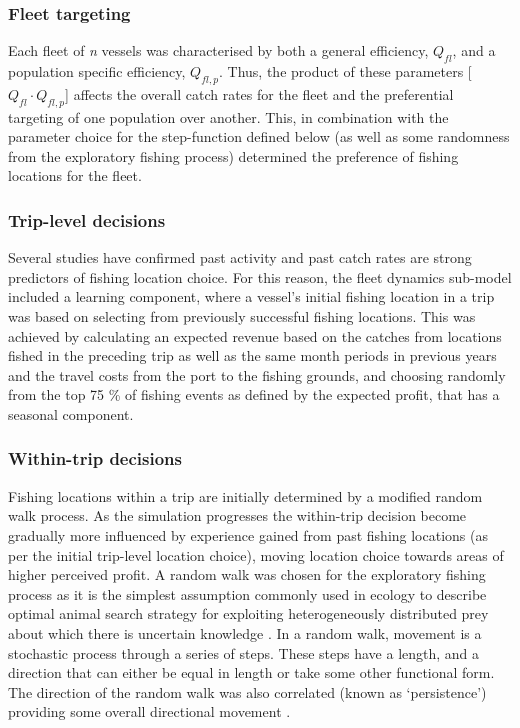 \documentclass[review]{elsarticle}
\begin{document}
\subsubsection{Fleet targeting}

Each fleet of \textit{n} vessels was characterised by both a general
efficiency, $Q_{fl}$, and a population specific efficiency, ${Q_{fl, p}}$.
Thus, the product of these parameters [$Q_{fl} \cdot Q_{fl, p}$] affects the
overall catch rates for the fleet and the preferential targeting of one
population over another. This, in combination with the parameter choice for the
step-function defined below (as well as some randomness from the exploratory
fishing process) determined the preference of fishing locations for the fleet.  

\subsubsection{Trip-level decisions}

Several studies \citep[e.g.][]{Hutton2004, Tidd2012, Girardin2015} have
confirmed past activity and past catch rates are strong predictors of fishing
location choice. For this reason, the fleet dynamics sub-model included a
learning component, where a vessel's initial fishing location in a trip was
based on selecting from previously successful fishing locations. This was
achieved by calculating an expected revenue based on the catches from locations
fished in the preceding trip as well as the same month periods in previous
years and the travel costs from the port to the fishing grounds, and choosing
randomly from the top 75 \% of fishing events as defined by the expected
profit, that has a seasonal component. 

\subsubsection{Within-trip decisions}

Fishing locations within a trip are initially determined by a modified random
walk process. As the simulation progresses the within-trip decision become
gradually more influenced by experience gained from past fishing locations (as
per the initial trip-level location choice), moving location choice towards
areas of higher perceived profit. A random walk was chosen for the exploratory
fishing process as it is the simplest assumption commonly used in ecology to
describe optimal animal search strategy for exploiting heterogeneously
distributed prey about which there is uncertain knowledge
\citep{Viswanathan1999}. In a random walk, movement is a stochastic process
through a series of steps. These steps have a length, and a direction that can
either be equal in length or take some other functional form. The direction of
the random walk was also correlated (known as `persistence') providing some
overall directional movement \citep{Codling2008}. \\
\end{document}
